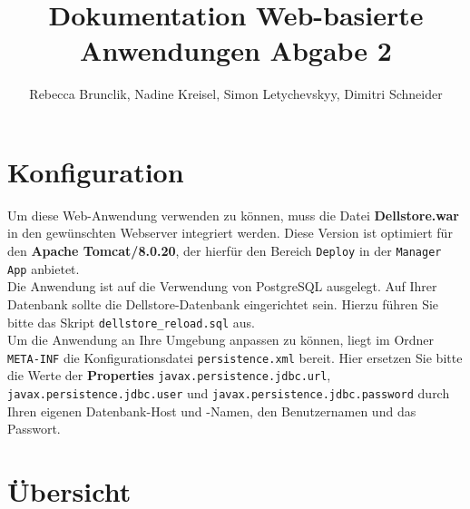 \documentclass [a4paper]{article}
\begin{document}
\pagestyle{fancy} %
\fancyhf{} %
\fancyhead[R]{} %
\renewcommand{\headrulewidth}{0.4pt} %
\fancyfoot[R]{\thepage}
\renewcommand{\footrulewidth}{0.4pt} %
\title{Dokumentation Web-basierte Anwendungen Abgabe 2}
\author{Rebecca Brunclik, Nadine Kreisel, Simon Letychevskyy, Dimitri Schneider }
\maketitle{}
\thispagestyle{empty}
\noindent
\lhead{}
\newpage
\section{Konfiguration}
Um diese Web-Anwendung verwenden zu können, muss die Datei \-\textbf{Dellstore.war} 
in den gewünschten Webserver integriert werden. Diese Version ist optimiert für den 
\textbf{Apache Tomcat/8.0.20}, der hierfür den Bereich \texttt{Deploy} in der \texttt{Manager App} 
anbietet.\\
Die Anwendung ist auf die Verwendung von PostgreSQL ausgelegt. Auf Ihrer Datenbank sollte die Dellstore-Datenbank 
eingerichtet sein. Hierzu führen Sie bitte das Skript \texttt{dellstore\_reload.sql} aus.
\\
Um die Anwendung an Ihre Umgebung anpassen zu können, liegt im Ordner
\texttt{META-INF} die Konfigurationsdatei \texttt{persistence.xml} bereit. Hier ersetzen Sie bitte
die Werte der \textbf{Properties} \texttt{javax.persistence.jdbc.url}, \texttt{javax.persis\-tence.jdbc.user} 
und \texttt{javax.persistence.jdbc.password} durch Ihren eigenen Datenbank-Host und -Namen, 
den Benutzernamen und das Passwort.\\


\section{Übersicht}
\end{document}
